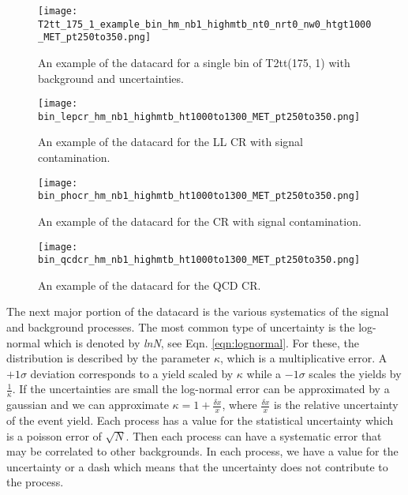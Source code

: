 \begin{figure}
	\begin{center}
  \texttt{[image: T2tt\_175\_1\_example\_bin\_hm\_nb1\_highmtb\_nt0\_nrt0\_nw0\_htgt1000\_MET\_pt250to350.png]}
	\end{center}
	\caption[Example Datacard of T2tt(175,1)]{An example of the datacard for a single bin of T2tt(175, 1) with background and uncertainties.
	 }
	\label{fig:example-datacard-sig}
\end{figure}
\begin{figure}
	\begin{center}
  \texttt{[image: bin\_lepcr\_hm\_nb1\_highmtb\_ht1000to1300\_MET\_pt250to350.png]}
	\end{center}
	\caption[Example Datacard of LL CR]{An example of the datacard for the LL CR with signal contamination.
	 }
	\label{fig:example-datacard-ll}
\end{figure}
\begin{figure}
	\begin{center}
  \texttt{[image: bin\_phocr\_hm\_nb1\_highmtb\_ht1000to1300\_MET\_pt250to350.png]}
	\end{center}
	\caption[Example Datacard of \Znunu{} CR]{An example of the datacard for the \Znunu{} CR with signal contamination.
	 }
	\label{fig:example-datacard-znunu}
\end{figure}
\begin{figure}
	\begin{center}
  \texttt{[image: bin\_qcdcr\_hm\_nb1\_highmtb\_ht1000to1300\_MET\_pt250to350.png]}
	\end{center}
	\caption[Example Datacard of QCD CR]{An example of the datacard for the QCD CR.
	 }
	\label{fig:example-datacard-qcd}
\end{figure}

The next major portion of the datacard is the various systematics of the signal and background processes. The most common type of uncertainty is the log-normal which is denoted by \textit{lnN}, see Eqn. \ref{eqn:lognormal}. For these, the distribution is described by the parameter $\kappa$, which is a multiplicative error. A $+1\sigma$ deviation corresponds to a yield scaled by $\kappa$ while a $-1\sigma$ scales the yields by $\frac{1}{\kappa}$. If the uncertainties are small the log-normal error can be approximated by a gaussian and we can approximate $\kappa=1+\frac{\delta x}{x}$, where $\frac{\delta x}{x}$ is the relative uncertainty of the event yield. Each process has a value for the statistical uncertainty which is a poisson error of $\sqrt{N}$. Then each process can have a systematic error that may be correlated to other backgrounds. In each process, we have a value for the uncertainty or a dash which means that the uncertainty does not contribute to the process. 


